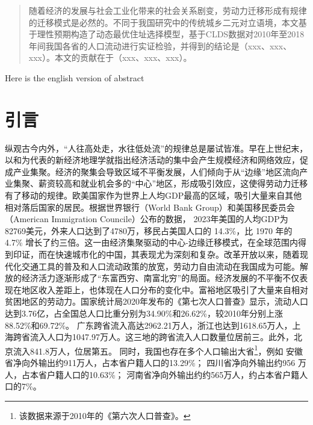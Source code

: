 \documentclass[master, final]{zufe-thesis}
\begin{document}
\makethesiscover
\makestatement
\makechinesetitlepage
\makeenglishtitlepage

\frontmatter

\begin{abstract}
随着经济的发展与社会工业化带来的社会关系剧变，劳动力迁移形成有规律的迁移模式是必然的。不同于我国研究中的传统城乡二元对立语境，本文基于理性预期构造了动态最优住址选择模型，基于CLDS数据对2010年至2018年间我国各省的人口流动进行实证检验，并得到的结论是（xxx、xxx、xxx）。本文的贡献在于（xxx、xxx、xxx）。
\end{abstract}

\begin{abstracten}
Here is the english version of abstract
\end{abstracten}

\tableofcontents

\mainmatter
\newpage
\chapter{引言}

纵观古今内外，“人往高处走，水往低处流”的规律总是屡试皆准。早在上世纪末，以\textcite{krugmanIncreasingReturnsEconomic1991}和\textcite{fujitaSpatialEconomyCities1999}为代表的新经济地理学就指出经济活动的集中会产生规模经济和网络效应，促成产业集聚。经济的聚集会导致区域不平衡发展，人们倾向于从“边缘”地区流向产业集聚、薪资较高和就业机会多的“中心”地区，形成吸引效应，这使得劳动力迁移有了移动的规律。欧美国家作为世界上人均GDP最高的区域，吸引大量来自其他相对落后国家的居民。根据世界银行（World Bank Group）和美国移民委员会（American Immigration Councile）公布的数据，
2023年美国的人均GDP为82769美元，外来人口达到了4780万，移民占美国人口的 14.3\%，比 1970 年的 4.7\% 增长了约三倍。这一由经济集聚驱动的中心-边缘迁移模式，在全球范围内得到印证，而在快速城市化的中国，其表现尤为深刻和复杂。改革开放以来，随着现代化交通工具的普及和人口流动政策的放宽，劳动力自由流动在我国成为可能。解放的经济活力逐渐形成了“东富西穷、南富北穷”的局面。经济发展的不平衡不仅表现在地区收入差距上，也体现在人口分布的变化中。富裕地区吸引了大量来自相对贫困地区的劳动力。国家统计局2020年发布的《第七次人口普查》显示，流动人口达到3.76亿，占全国总人口比重分别为34.90\%和26.62\%，较2010年分别上涨88.52\%和69.72\%。
广东跨省流入高达2962.21万人，浙江也达到1618.65万人，上海跨省流入人口为1047.97万人。这三地的跨省流入人口数量位居前三。此外，北京流入841.8万人，位居第五。
同时，我国也存在多个人口输出大省\footnote{该数据来源于2010年的《第六次人口普查》。}，例如
安徽省净向外输出约911万人，占本省户籍人口的13.29\%；
四川省净向外输出约956 万人，占本省户籍人口的10.63\%；
河南省净向外输出约约565万人，约占本省户籍人口的7\%。
\end{document}
